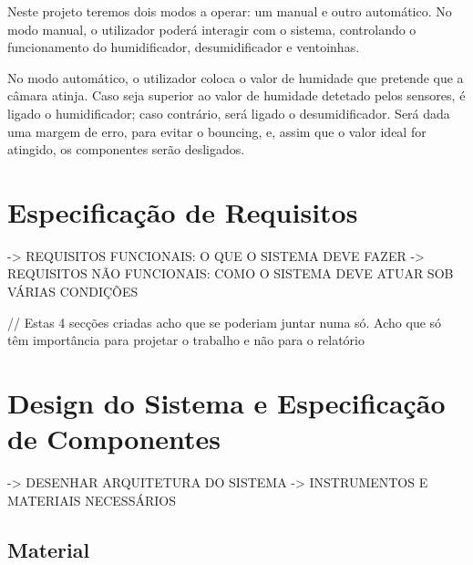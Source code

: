 \documentclass[journal]{IEEEtran}
\begin{document}
Neste projeto teremos dois modos a operar: um manual e outro automático.
No modo manual, o utilizador poderá interagir com o sistema, controlando o funcionamento do humidificador, desumidificador e ventoinhas.

No modo automático, o utilizador coloca o valor de humidade que pretende que a câmara atinja. Caso seja superior ao valor de humidade detetado pelos sensores, é ligado o humidificador; caso contrário, será ligado o desumidificador. 
Será dada uma margem de erro, para evitar o bouncing, e, assim que o valor ideal for atingido, os componentes serão desligados.







\section{Especificação de Requisitos}

-> REQUISITOS FUNCIONAIS: O QUE O SISTEMA DEVE FAZER
-> REQUISITOS NÃO FUNCIONAIS: COMO O SISTEMA DEVE ATUAR SOB VÁRIAS CONDIÇÕES

// Estas 4 secções criadas acho que se poderiam juntar numa só. Acho que só têm importância para projetar o trabalho e não para o relatório





\section{Design do Sistema e Especificação de Componentes}

-> DESENHAR ARQUITETURA DO SISTEMA
-> INSTRUMENTOS E MATERIAIS NECESSÁRIOS

\subsection{Material}


\end{document}
